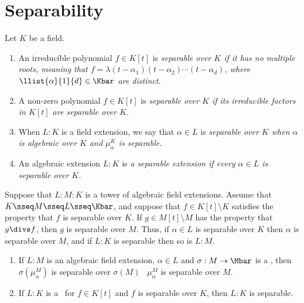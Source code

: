 \documentclass[a4paper]{article}
\begin{document}
\section{Separability}
\begin{tdefinition}[Separable]
  Let \( K \) be a field. \begin{enumerate}[label=(\roman*)]
    \item An irreducible polynomial \( f\in K[t] \) is \it{separable over \( K \)} if it has no multiple roots, meaning that \( f=\lambda(t-\alpha_1)(t-\alpha_2)\cdots(t-\alpha_d) \), where \( \llist{\alpha}{1}{d}\in \Kbar \) are distinct.
    \item A non-zero polynomial \( f\in K[t] \) is \it{separable over \( K \)} if its irreducible factors in \( K[t] \) are separable over \( K \).
    \item When \( L:K \) is a field extension, we say that \( \alpha \in L \) is \it{separable over \( K \)} when \( \alpha \) is algebraic over \( K \) and \( \mu_\alpha^K \) is separable.
    \item An algebraic extension \( L:K \) is \it{a separable extension} if every \( \alpha\in L \) is separable over \( K \).
  \end{enumerate}
\end{tdefinition}

\begin{tlemma}
  Suppose that \( L:M:K \) is a tower of algebraic field extensions.
  Assume that \( K\sseq M\sseq L\sseq \Kbar \), and suppose that \( f\in K[t]\setminus K \) satisfies the property that \( f \) is separable over \( K \).
  If \( g\in M[t]\setminus M \) has the property that \( g\divs f \), then \( g \) is separable over \( M \).
  Thus, if \( \alpha\in L \) is separable over \( K \) then \( \alpha \) is separable over \( M \), and if \( L:K \) is separable then so is \( L:M \).
\end{tlemma}

\begin{tlemma}
  \begin{enumerate}
    \item If \( L:M \) is an algebraic field extension, \( \alpha\in L \) and \( \sigma:M\to\Mbar \) is a \homo, then \( \sigma(\mu_\alpha^M) \) is separable over \( \sigma(M) \) \iff~\( \mu_\alpha^M  \) is separable over \( M \).
    \item If \( L:K \) is a \sfe~for \( f\in K[t] \) and \( f \) is separable over \( K \), then \( L:K \) is separable.
  \end{enumerate}
\end{tlemma}
\end{document}
